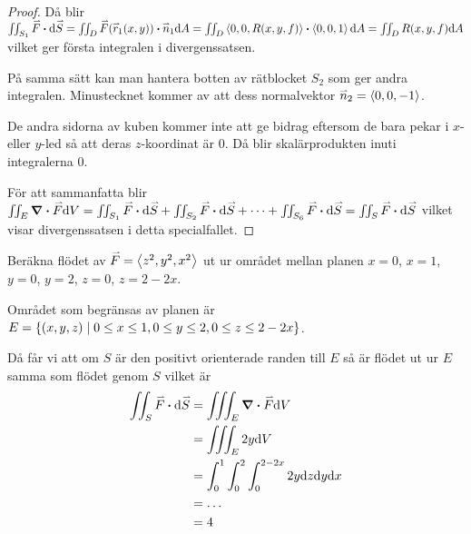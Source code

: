 \documentclass[a4paper]{article}
\begin{document}
\begin{sats}[Divergenssatsen]
\begin{proof}
        Då blir \(
            \iint_{S_1} \vef \sprod \dd \ve{S} = \iint_D \vef(\ver_1(x,y)) \sprod \ven_1 \dd A
                = \iint_D \lang 0,0,R(x,y,f)\rang \sprod \lang 0,0,1\rang \dd A
                = \iint_D R(x,y,f) \dd A
        \) vilket ger första integralen i divergenssatsen.

        På samma sätt kan man hantera botten av rätblocket \(
            S_2
        \) som ger andra integralen. Minustecknet kommer av att dess normalvektor \(
            \accentset{\rightharpoonup}{n}_2 = \left\langle 0,0,-1\right\rangle
        \).

        De andra sidorna av kuben kommer inte att ge bidrag eftersom de bara 
        pekar i \(
            x
        \)- eller \(
            y
        \)-led så att deras \(
            z
        \)-koordinat är \(
            0
        \). Då blir skalärprodukten inuti integralerna \(
            0
        \).

        För att sammanfatta blir \(
            \iint_E \div{\vef} \dd V = \iint_{S_1} \vef \sprod \dd \ve{S} 
                    + \iint_{S_2} \vef \sprod \dd \ve{S} 
                    + \cdots
                    + \iint_{S_6} \vef \sprod \dd \ve{S} 
                = \iint_S \vef \sprod \dd \ve{S}
        \) vilket visar divergenssatsen i detta specialfallet.
    \end{proof}
\end{sats}

\begin{ex}
    Beräkna flödet av \(
        \accentset{\rightharpoonup}{F} = \left\langle z^2, y^2, x^2 \right\rangle
    \) ut ur området mellan planen \(
        x=0
    \), \(
        x=1
    \), \(
        y=0
    \), \(
        y=2
    \), \(
        z=0
    \), \(
        z=2-2x
    \).

    Området som begränsas av planen är \(
        E = \{ (x,y,z) \; | \; 0 \leq x \leq 1, 0 \leq y \leq 2, 0 \leq z \leq 2-2x \}
    \). 

    Då får vi att om \(
        S
    \) är den positivt orienterade randen till \(
        E
    \) så är flödet ut ur \(
        E
    \) samma som flödet genom \(
        S
    \) vilket är 
    \begin{align*}
        \iint_S \vef \sprod \dd \ve{S} &= \iiint_E \div{\vef} \dd V \\
            &= \iiint_E 2y \dd V \\
            &= \int_0^1 \int_0^2 \int_0^{2-2x} 2y \dd z \dd y \dd x \\
            &= \dots \\
            &= 4
    \end{align*}
\end{ex}
\end{document}
